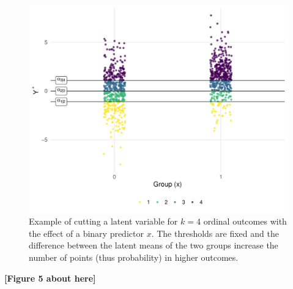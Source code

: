 \documentclass[
  man,floatsintext]{apa6}
\begin{document}
\normalsize

\scriptsize

\begin{figure}

{\centering \includegraphics[width=1\linewidth]{paper_files/figure-latex/fig-sim-from-latent-1} 

}

\caption{Example of cutting a latent variable for \(k = 4\) ordinal outcomes with the effect of a binary predictor \(x\). The thresholds are fixed and the difference between the latent means of the two groups increase the number of points (thus probability) in higher outcomes.}\label{fig:fig-sim-from-latent}
\end{figure}

\begin{center}\textbf{[Figure 5 about here]} \end{center}

\normalsize

\scriptsize
\end{document}
